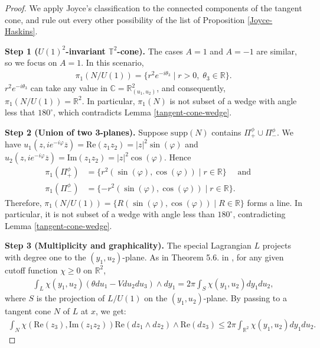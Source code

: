 \documentclass[11pt]{article}
\begin{document}
\begin{proof} We apply Joyce's classification to the connected components of the tangent cone, and rule out every other possibility of the list of Proposition \ref{Joyce-Haskins}.

\textbf{Step 1 ($U(1)^2$-invariant $\mathbb{T}^2$-cone).} The cases $A = 1$ and $A = -1$ are similar, so we focus on $A = 1$. In this scenario,
\begin{align*}
    \pi_1(N/U(1)) = \{ r^2e^{-i\theta_3} \; | \; r > 0, \; \theta_3 \in \mathbb{R} \}.
\end{align*}
$r^2e^{-i\theta_3}$ can take any value in $\mathbb{C} = \mathbb{R}^2_{(u_1,u_2)}$, and consequently, $\pi_1(N/U(1)) = \mathbb{R}^2$. In particular, $\pi_1(N)$ is not subset of a wedge with angle less that $180^{\circ}$, which contradicts Lemma \ref{tangent-cone-wedge}.

\textbf{Step 2 (Union of two 3-planes).}  Suppose $\text{supp}(N)$ contains  $\Pi^{\phi}_+ \cup  \Pi^{\phi}_-$. We have $u_1(z, ie^{-i \varphi} \overline{z}) = \text{Re}(z_1z_2) = |z|^2 \sin (\varphi)$ and $u_2(z, ie^{-i \varphi} \overline{z}) = \text{Im}(z_1z_2) = |z|^2 \cos (\varphi)$. Hence
\begin{align*}
    \pi_1(\Pi^{\phi}_+) &= \{ r^2 (\sin (\varphi), \cos(\varphi)) \; | \; r \in \mathbb{R} \} \quad \text{ and } \quad \\\pi_1(\Pi^{\phi}_-) &= \{ -r^2 (\sin (\varphi), \cos(\varphi)) \; | \; r \in \mathbb{R} \}.
\end{align*} 
Therefore, $\pi_1(N/U(1)) = \{ R (\sin (\varphi), \cos(\varphi)) \; | \; R \in \mathbb{R}\}$ forms a line. In particular, it is not subset of a wedge with angle less than $180^{\circ}$, contradicting Lemma \ref{tangent-cone-wedge}.


\textbf{Step 3 (Multiplicity and graphicality).} The special Lagrangian $L$ projects with degree one to the $ (y_1,u_2)$-plane.  
As in Theorem 5.6. in \cite{MR2122282}, for any given cutoff function $\chi\geq 0$ on $\mathbb{R}^2$,
\begin{align*}
    \int_L \chi (y_1, u_2)  (\theta du_1 - V du_2 du_3) \wedge dy_1 = 2 \pi \int_{S} \chi(y_1,u_2) dy_1 du_2,
\end{align*}
where $S$ is the projection of $L/U(1)$ on the $(y_1, u_2)$-plane. By passing to a tangent cone $N$ of $L$ at $x$, we get:
\begin{align*}
    \int_N \chi (\text{Re}(z_3), \text{Im}(z_1 z_2)) \text{Re}(dz_1 \wedge dz_2) \wedge \text{Re}(dz_3) \leq 2 \pi \int_{\mathbb{R}^2} \chi(y_1,u_2) dy_1 du_2.
\end{align*}








\end{proof}
\end{document}
